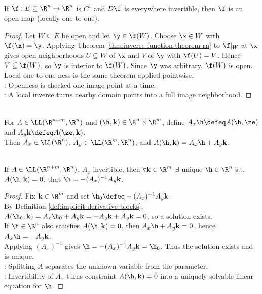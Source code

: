 \begin{corollary} \label{cor:local-diffeomorphism-open-map} \\
If $\f:E\subseteq\R^n\to\R^n$ is $C^1$ and $D\f$ is everywhere invertible, then $\f$ is an open map (locally one-to-one).
\begin{proof}
Let $W\subseteq E$ be open and let $\y\in\f(W)$. Choose $\x\in W$ with $\f(\x)=\y$. Applying Theorem \ref{thm:inverse-function-theorem-rn} to $\f|_W$ at $\x$ gives open neighborhoods $U\subseteq W$ of $\x$ and $V$ of $\y$ with $\f(U)=V$. Hence $V\subseteq\f(W)$, so $\y$ is interior to $\f(W)$. Since $\y$ was arbitrary, $\f(W)$ is open. Local one-to-one-ness is the same theorem applied pointwise.\\
: Openness is checked one image point at a time.\\
: A local inverse turns nearby domain points into a full image neighborhood.
\end{proof}
\end{corollary}

\begin{definition} \label{def:implicit-derivative-blocks} \\
For $A\in\LL(\R^{n+m},\R^n)$ and $(\h,\mathbf{k})\in\R^n\times\R^m$, define $A_x\h\defeq A(\h,\ze)$ and $A_y\mathbf{k}\defeq A(\ze,\mathbf{k})$.\\
Then $A_x\in\LL(\R^n)$, $A_y\in\LL(\R^m,\R^n)$, and $A(\h,\mathbf{k})=A_x\h+A_y\mathbf{k}$.
\end{definition}

\begin{theorem} \label{thm:linear-implicit-function-theorem} \\
If $A\in\LL(\R^{n+m},\R^n)$, $A_x$ invertible, then $\forall \mathbf{k}\in\R^m$ $\exists$ unique $\h\in\R^n$ s.t. $A(\h,\mathbf{k})=0$, that $\h=-(A_x)^{-1}A_y\mathbf{k}$.
\begin{proof}
Fix $\mathbf{k}\in\R^m$ and set $\h_0\defeq-(A_x)^{-1}A_y\mathbf{k}$.\\
By Definition \ref{def:implicit-derivative-blocks}, $A(\h_0,\mathbf{k}) =A_x\h_0+A_y\mathbf{k} =-A_y\mathbf{k}+A_y\mathbf{k} =0$, so a solution exists.\\
If $\h\in\R^n$ also satisfies $A(\h,\mathbf{k})=0$, then $A_x\h+A_y\mathbf{k}=0$, hence $A_x\h=-A_y\mathbf{k}$.\\
Applying $(A_x)^{-1}$ gives $\h=-(A_x)^{-1}A_y\mathbf{k}=\h_0$. Thus the solution exists and is unique.\\
: Splitting $A$ separates the unknown variable from the parameter.\\
: Invertibility of $A_x$ turns constraint $A(\h,\mathbf{k})=0$ into a uniquely solvable linear equation for $\h$.
\end{proof}
\end{theorem}

